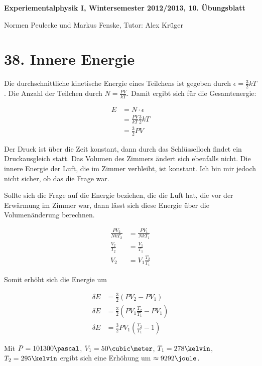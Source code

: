 \documentclass[a4paper,german,12pt,smallheadings]{scrartcl}
\begin{document}
\begin{center}
\bfseries %
\sffamily %
\vspace{-40pt}
Experiementalphysik I, Wintersemester 2012/2013, 10. Übungsblatt

Normen Peulecke und Markus Fenske, Tutor: Alex Krüger
\vspace{-10pt}
\end{center}


\section*{38. Innere Energie}

Die durchschnittliche kinetische Energie eines Teilchens ist gegeben durch
$\epsilon = \frac{3}{2} kT$. Die Anzahl der Teilchen durch $N = \frac{PV}{kT}$.
Damit ergibt sich für die Gesamtenergie:

\begin{align*}
  E &= N \cdot \epsilon \\
    &= \frac{PV}{kT} \frac{3}{2} kT \\
    &= \frac{3}{2} PV
\end{align*}

Der Druck ist über die Zeit konstant, dann durch das Schlüsselloch findet ein
Druckausgleich statt. Das Volumen des Zimmers ändert sich ebenfalls nicht. Die
innere Energie der Luft, die im Zimmer verbleibt, ist konstant. Ich bin mir
jedoch nicht sicher, ob das die Frage war.

Sollte sich die Frage auf die Energie beziehen, die die Luft hat, die vor der
Erwärmung im Zimmer war, dann lässt sich diese Energie über die Volumenänderung
berechnen.

\begin{align*}
  \frac{PV_2}{NkT_2} &= \frac{PV_1}{NkT_1} \\
  \frac{V_2}{T_2} &= \frac{V_1}{T_1} \\
  V_2 &= V_1 \frac{T_2}{T_1}
\end{align*}

Somit erhöht sich die Energie um

\begin{align*}
  \delta E &= \frac{3}{2} (PV_2 - PV_1) \\
  \delta E &= \frac{3}{2} \left(PV_1 \frac{T_2}{T_1} - PV_1\right) \\
  \delta E &= \frac{3}{2} PV_1 \left(\frac{T_2}{T_1} - 1\right)
\end{align*}

Mit $P = 101300 \pascal$, $V_1 = 50 \cubic\meter$, $T_1 = 278 \kelvin$, $T_2 =
295 \kelvin$ ergibt sich eine Erhöhung um $\approx 9292 \joule$.
\end{document}

